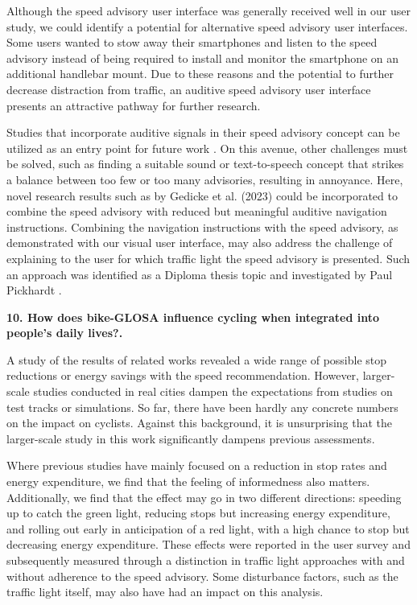 Although the speed advisory user interface was generally received well in our user study, we could identify a potential for alternative speed advisory user interfaces. Some users wanted to stow away their smartphones and listen to the speed advisory instead of being required to install and monitor the smartphone on an additional handlebar mount. Due to these reasons and the potential to further decrease distraction from traffic, an auditive speed advisory user interface presents an attractive pathway for further research. 

Studies that incorporate auditive signals in their speed advisory concept can be utilized as an entry point for future work \cite{suramardhana_driver-centric_2014, xu_bb_2015, wilson_driver_2017, sokolov_effects_2018, zhang_green_2020, chen_developing_2022}. On this avenue, other challenges must be solved, such as finding a suitable sound or text-to-speech concept that strikes a balance between too few or too many advisories, resulting in annoyance. Here, novel research results such as by Gedicke et al. (2023) \cite{gedicke_selecting_2023} could be incorporated to combine the speed advisory with reduced but meaningful auditive navigation instructions. Combining the navigation instructions with the speed advisory, as demonstrated with our visual user interface, may also address the challenge of explaining to the user for which traffic light the speed advisory is presented. Such an approach was identified as a Diploma thesis topic and investigated by Paul Pickhardt \cite{pickhardt_2023}.

\textbf{\color{cidarkblue}10. How does bike-GLOSA influence cycling when integrated into people's daily lives?.} 

A study of the results of related works revealed a wide range of possible stop reductions or energy savings with the speed recommendation. However, larger-scale studies conducted in real cities dampen the expectations from studies on test tracks or simulations. So far, there have been hardly any concrete numbers on the impact on cyclists. Against this background, it is unsurprising that the larger-scale study in this work significantly dampens previous assessments. 

Where previous studies have mainly focused on a reduction in stop rates and energy expenditure, we find that the feeling of informedness also matters. Additionally, we find that the effect may go in two different directions: speeding up to catch the green light, reducing stops but increasing energy expenditure, and rolling out early in anticipation of a red light, with a high chance to stop but decreasing energy expenditure. These effects were reported in the user survey and subsequently measured through a distinction in traffic light approaches with and without adherence to the speed advisory. Some disturbance factors, such as the traffic light itself, may also have had an impact on this analysis.

